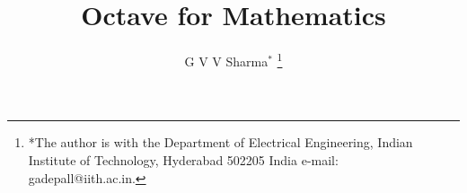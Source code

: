 \documentclass[journal,12pt,onecolumn]{IEEEtran}
\begin{document}
\title{Octave for Mathematics}
%
%
%

\author{G V V Sharma$^{*}$%
\thanks{*The author is with the Department
of Electrical Engineering, Indian Institute of Technology, Hyderabad
502205 India e-mail:  gadepall@iith.ac.in.}%
}
% 
%



% 
\end{document}
